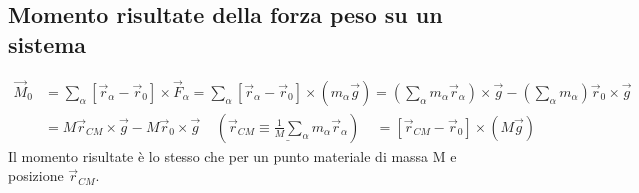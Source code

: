 \subsection{Momento risultate della forza peso su un sistema}
\begin{equation*}
    \begin{split}
        \vec{M}_0 & = \sum_{\alpha}[\vec{r}_{\alpha} - \vec{r}_0] \times \vec{F}_{\alpha} = \sum_{\alpha}[\vec{r}_{\alpha} - \vec{r}_0] \times (m_{\alpha}\vec{g}) = (\sum_{\alpha}m_{\alpha}\vec{r}_{\alpha}) \times \vec{g} - (\sum_{\alpha}m_{\alpha})\vec{r}_0 \times \vec{g}\\
                  & = M\vec{r}_{CM} \times \vec{g} - M\vec{r}_0 \times \vec{g} \:\:\:\:\:(\underline{\vec{r}_{CM} \equiv \frac{1}{M}\sum_{\alpha}m_{\alpha}\vec{r}_{\alpha}}) \:\:\:\:\: = [\vec{r}_{CM} - \vec{r}_0] \times (M\vec{g}) 
    \end{split}
\end{equation*}
Il momento risultate è lo stesso che per un punto materiale di massa M e posizione $\vec{r}_{CM}$.
